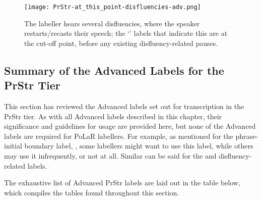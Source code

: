 \begin{figure}[H]
\centering
%
\texttt{[image: PrStr-at\_this\_point-disfluencies-adv.png]}
%
\caption[The labeller hears several disfluencies.]{The labeller hears several disfluencies, where the speaker restarts\slash recasts their speech; the ‘’ labels that indicate this are at the cut-off point, before any existing disfluency-related pauses.%
\label{fig:at_this_point-disfluencies PrStr Adv}%
}
\end{figure}

\subsection{Summary of the Advanced Labels for the PrStr Tier}
This section has reviewed the Advanced labels set out for transcription in the PrStr tier. As with all Advanced labels described in this chapter, their significance and guidelines for usage are provided here, but none of the Advanced labels are required for PoLaR labellers. For example, as mentioned for the phrase-initial boundary label, \textlabel{[}, some labellers might want to use this label, while others may use it infrequently, or not at all. Similar can be said for the \textlabel{**} and disfluency-related labels.

The exhaustive list of Advanced PrStr labels are laid out in the table below, which compiles the tables found throughout this section.


